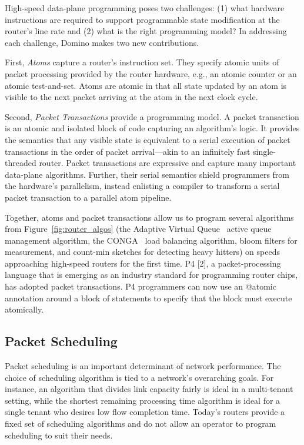 High-speed data-plane programming poses two challenges: (1) what hardware instructions are required to support programmable state modification at the router’s line rate and (2) what is the right programming model? In addressing each challenge, Domino makes two new contributions.

First, \textit{Atoms} capture a router’s instruction set. They specify atomic
units of packet processing provided by the router hardware, e.g., an atomic
counter or an atomic test-and-set. Atoms are atomic in that all state updated
by an atom is visible to the next packet arriving at the atom in the next clock
cycle.

Second, \textit{Packet Transactions} provide a programming model. A packet
transaction is an atomic and isolated block of code capturing an algorithm’s
logic. It provides the semantics that any visible state is equivalent to a
serial execution of packet transactions in the order of packet arrival—akin to
an infinitely fast single-threaded router. Packet transactions are expressive
and capture many important data-plane algorithms. Further, their serial
semantics shield programmers from the hardware’s parallelism, instead enlisting
a compiler to transform a serial packet transaction to a parallel atom
pipeline.

Together, atoms and packet transactions allow us to program several algorithms
from Figure~\ref{fig:router_algos} (\eg the Adaptive Virtual Queue~\cite{AVQ}
active queue management algorithm, the CONGA~\cite{conga} load balancing
algorithm, bloom filters for measurement, and count-min sketches for detecting
heavy hitters) on speeds approaching high-speed routers for the first time. P4
[2], a packet-processing language that is emerging as an industry standard for
programming router chips, has adopted packet transactions.  P4 programmers can
now use an @atomic annotation around a block of statements to specify that the
block must execute atomically.

\subsection{Packet Scheduling}

Packet scheduling is an important determinant of network performance. The
choice of scheduling algorithm is tied to a network’s overarching goals. For
instance, an algorithm that divides link capacity fairly is ideal in a
multi-tenant setting, while the shortest remaining processing time algorithm is
ideal for a single tenant who desires low flow completion time. Today’s routers
provide a fixed set of scheduling algorithms and do not allow an operator to
program scheduling to suit their needs.


